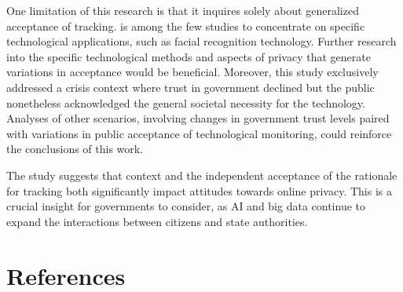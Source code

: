 \documentclass[
  number]{elsarticle}
\begin{document}
One limitation of this research is that it inquires solely about
generalized acceptance of tracking. \citep{kostka2021} is among the few
studies to concentrate on specific technological applications, such as
facial recognition technology. Further research into the specific
technological methods and aspects of privacy that generate variations in
acceptance would be beneficial. Moreover, this study exclusively
addressed a crisis context where trust in government declined but the
public nonetheless acknowledged the general societal necessity for the
technology. Analyses of other scenarios, involving changes in government
trust levels paired with variations in public acceptance of
technological monitoring, could reinforce the conclusions of this work.

The study suggests that context and the independent acceptance of the
rationale for tracking both significantly impact attitudes towards
online privacy. This is a crucial insight for governments to consider,
as AI and big data continue to expand the interactions between citizens
and state authorities.

\newpage{}

\section{References}\label{references}
\end{document}
